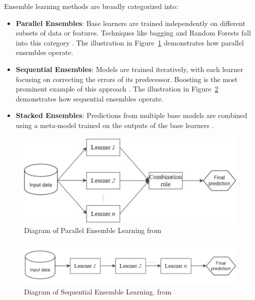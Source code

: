 Ensemble learning methods are broadly categorized into:
\begin{itemize}
    \item \textbf{Parallel Ensembles}: Base learners are trained independently on different subsets of data or features. Techniques like bagging and Random Forests fall into this category \parencite{Breiman1996}. The illustration in Figure~\ref{fig:parallel_emsemble} demonstrates how parallel ensembles operate.
    \item \textbf{Sequential Ensembles}: Models are trained iteratively, with each learner focusing on correcting the errors of its predecessor. Boosting is the most prominent example of this approach \parencite{Schapire1990}. The illustration in Figure~\ref{fig:sequential_emsemble} demonstrates how sequential ensembles operate.
    \item \textbf{Stacked Ensembles}: Predictions from multiple base models are combined using a meta-model trained on the outputs of the base learners \parencite{Mienye2022}.
\end{itemize}

\begin{figure}[b!]
    \centering
    \includegraphics[width=\textwidth]{ch2/assets/Block_diagram_of_parallel_ensemble_learning.png}
    \caption{Diagram of Parallel Ensemble Learning from \parencite{Mienye2022}}
    \label{fig:parallel_emsemble}
\end{figure}

\clearpage

\begin{figure}[t!]
    \centering
    \includegraphics[width=\textwidth]{ch2/assets/Block_diagram_of_sequential_ensemble_learning.png}
    \caption{Diagram of Sequential Ensemble Learning. from \parencite{Mienye2022}}
    \label{fig:sequential_emsemble}
\end{figure}

